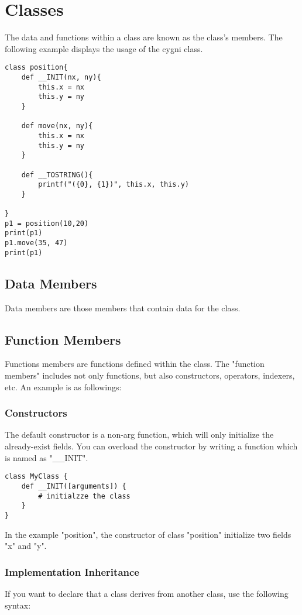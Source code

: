 \chapter{Classes}
The data and functions within a class are known as the class's members.
The following example displays the usage of the cygni class.

\begin{lstlisting}
class position{
	def __INIT(nx, ny){
		this.x = nx
		this.y = ny
	}

	def move(nx, ny){
		this.x = nx
		this.y = ny
	}

	def __TOSTRING(){
		printf("({0}, {1})", this.x, this.y)
	}

}
p1 = position(10,20)
print(p1)
p1.move(35, 47)
print(p1)
\end{lstlisting}

\section{Data Members}
Data members are those members that contain data for the class.


\section{Function Members}
Functions members are functions defined within the class. The "function members" includes not only functions, but also constructors, operators, indexers, etc. An example is as followings:

\subsection{Constructors}
The default constructor is a non-arg function, which will only initialize the already-exist fields. You can overload the constructor by writing a function which is named as "\_\_INIT".

\begin{lstlisting}
class MyClass {
	def __INIT([arguments]) {
		# initialzze the class
	}
}
\end{lstlisting}

In the example "position", the constructor of class "position" initialize two fields "x" and "y".

\subsection{Implementation Inheritance}
If you want to declare that a class derives from another class, use the following syntax:


